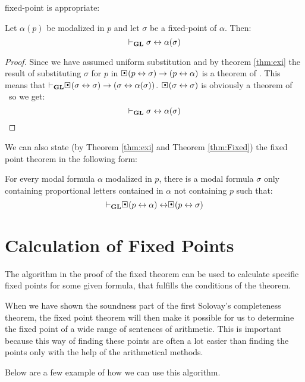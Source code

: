 \documentclass[../main.tex]{subfiles}
\begin{document}
fixed-point is appropriate:
\begin{cor}
	Let $\alpha(p)$ be modalized in $p$ and let $\sigma$ be a fixed-point
	of $\alpha$. Then:
	\[\vdash_{\text{\textbf{GL}}}\sigma\leftrightarrow\alpha(\sigma)\]
\end{cor}
\begin{proof}
	Since we have assumed uniform substitution and by theorem \ref{thm:exi}
	the result of substituting $\sigma$ for $p$ in
	$\sBox(p\leftrightarrow\sigma)\rightarrow(p\leftrightarrow\alpha)$ is a
	theorem of \GL. This means that
	$\vdash_\GL\sBox(\sigma\leftrightarrow\sigma)\rightarrow(\sigma\leftrightarrow\alpha(\sigma))$.
	$\sBox(\sigma\leftrightarrow\sigma)$ is obviously a theorem of \GL\ so
	we get:
	\[\vdash_{\text{\textbf{GL}}}\sigma\leftrightarrow\alpha(\sigma)\]
\end{proof}
We can also state  (by Theorem \ref{thm:exi} and Theorem \ref{thm:Fixed}) the fixed
point theorem in the following form:

\begin{cor}
	\label{cor:Fixed}
	For every modal formula $\alpha$ modalized in $p$, there is a modal formula
	$\sigma$ only containing proportional letters contained in $\alpha$ not
	containing $p$ such that:
	\[\vdash_\GL\sBox(p\leftrightarrow\alpha)\leftrightarrow\sBox(p\leftrightarrow\sigma)\]
\end{cor}
\section{Calculation of Fixed Points}

The algorithm in the proof of the fixed theorem can be used to calculate
specific fixed points for some given formula, that fulfills the conditions of
the theorem. 

When we have shown the soundness part of the first Solovay's completeness theorem, the fixed point theorem
will then make it possible for us to determine the fixed point of a wide range
of sentences of arithmetic. This is important because this way of finding these
points are often a lot easier than finding the points only with the help of the
arithmetical methods.

Below are a few example of how we can use this algorithm.
\end{document}

